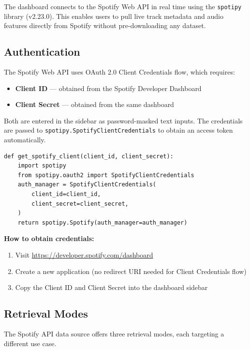 \documentclass[12pt,a4paper]{article}
\begin{document}
The dashboard connects to the Spotify Web API in real time using the \texttt{spotipy} library (v2.23.0). This enables users to pull live track metadata and audio features directly from Spotify without pre-downloading any dataset.

\subsection{Authentication}

The Spotify Web API uses OAuth 2.0 Client Credentials flow, which requires:

\begin{itemize}[noitemsep]
    \item \textbf{Client ID} --- obtained from the Spotify Developer Dashboard
    \item \textbf{Client Secret} --- obtained from the same dashboard
\end{itemize}

Both are entered in the sidebar as password-masked text inputs. The credentials are passed to \texttt{spotipy.SpotifyClientCredentials} to obtain an access token automatically.

\begin{lstlisting}[style=pythonstyle, caption={Spotify client initialization}]
def get_spotify_client(client_id, client_secret):
    import spotipy
    from spotipy.oauth2 import SpotifyClientCredentials
    auth_manager = SpotifyClientCredentials(
        client_id=client_id,
        client_secret=client_secret,
    )
    return spotipy.Spotify(auth_manager=auth_manager)
\end{lstlisting}

\textbf{How to obtain credentials:}
\begin{enumerate}[noitemsep]
    \item Visit \url{https://developer.spotify.com/dashboard}
    \item Create a new application (no redirect URI needed for Client Credentials flow)
    \item Copy the Client ID and Client Secret into the dashboard sidebar
\end{enumerate}

\subsection{Retrieval Modes}

The Spotify API data source offers three retrieval modes, each targeting a different use case.
\end{document}
